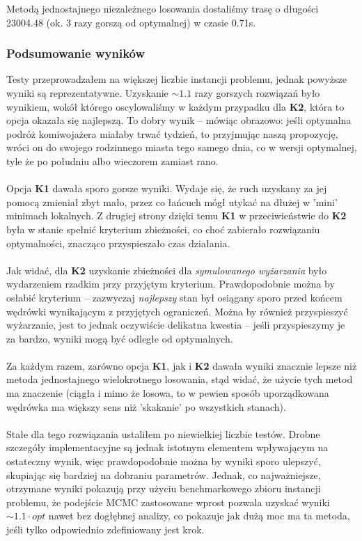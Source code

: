 \documentclass[a4paper]{article}
\theoremstyle{defn}
\theoremstyle{theorem}
\theoremstyle{lemma}
\theoremstyle{cor}
\theoremstyle{fact}
\begin{document}
Metodą jednostajnego niezależnego losowania dostaliśmy trasę o długości 23004.48 (ok. 3 razy gorszą od optymalnej) w czasie 0.71s.

\subsubsection{Podsumowanie wyników}
Testy przeprowadzałem na większej liczbie instancji problemu, jednak powyższe wyniki są reprezentatywne. Uzyskanie $\sim 1.1$ razy gorszych rozwiązań było wynikiem, wokół którego oscylowaliśmy w każdym przypadku dla \textbf{K2}, która to opcja okazała się najlepszą. To dobry wynik – mówiąc obrazowo: jeśli optymalna podróż komiwojażera miałaby trwać tydzień, to przyjmując naszą propozycję, wróci on do swojego rodzinnego miasta tego samego dnia, co w wersji optymalnej, tyle że po południu albo wieczorem zamiast rano.\\\\
Opcja \textbf{K1} dawała sporo gorsze wyniki. Wydaje się, że ruch uzyskany za jej pomocą zmieniał zbyt mało, przez co łańcuch mógł utykać na dłużej w 'mini' minimach lokalnych. Z drugiej strony dzięki temu \textbf{K1} w przeciwieństwie do \textbf{K2} była w stanie spełnić kryterium zbieżności, co choć zabierało rozwiązaniu optymalności, znacząco przyspieszało czas działania.\\\\
Jak widać, dla \textbf{K2} uzyskanie zbieżności dla \textit{symulowanego wyżarzania} było wydarzeniem rzadkim przy przyjętym kryterium. Prawdopodobnie można by osłabić kryterium – zazwyczaj \textit{najlepszy} stan był osiągany sporo przed końcem wędrówki wynikającym z przyjętych ograniczeń. Można by również przyspieszyć wyżarzanie, jest to jednak oczywiście delikatna kwestia – jeśli przyspieszymy je za bardzo, wyniki mogą być odległe od optymalnych.\\\\
Za każdym razem, zarówno opcja \textbf{K1}, jak i \textbf{K2} dawała wyniki znacznie lepsze niż metoda jednostajnego wielokrotnego losowania, stąd widać, że użycie tych metod ma znaczenie (ciągła i mimo że losowa, to w pewien sposób uporządkowana wędrówka ma większy sens niż 'skakanie' po wszystkich stanach).\\\\
Stałe dla tego rozwiązania ustaliłem po niewielkiej liczbie testów. Drobne szczegóły implementacyjne są jednak istotnym elementem wpływającym na ostateczny wynik, więc prawdopodobnie można by wyniki sporo ulepszyć, skupiając się bardziej na dobraniu parametrów. Jednak, co najważniejsze, otrzymane wyniki pokazują przy użyciu benchmarkowego zbioru instancji problemu, że podejście MCMC zastosowane wprost pozwala uzyskać wyniki $\sim 1.1 \cdot opt$ nawet bez dogłębnej analizy, co pokazuje jak dużą moc ma ta metoda, jeśli tylko odpowiednio zdefiniowany jest krok.
\end{document}
